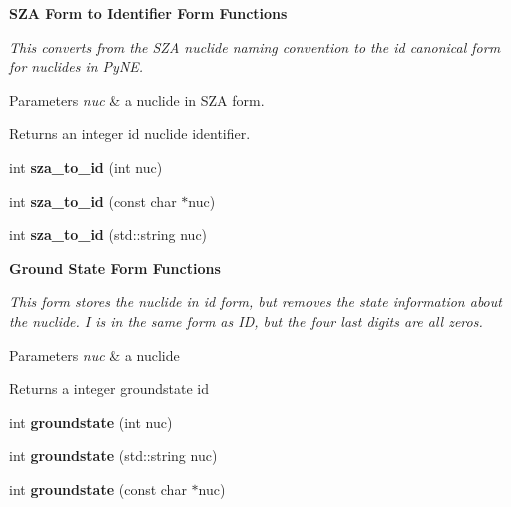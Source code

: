 \begin{Indent}{\bf S\+ZA Form to Identifier Form Functions}\par
{\em This converts from the S\+ZA nuclide naming convention to the id canonical form for nuclides in Py\+NE. 
\begin{DoxyParams}{Parameters}
{\em nuc} & a nuclide in S\+ZA form. \\
\hline
\end{DoxyParams}
\begin{DoxyReturn}{Returns}
an integer id nuclide identifier. 
\end{DoxyReturn}
}\begin{DoxyCompactItemize}
\item 
int {\bfseries sza\+\_\+to\+\_\+id} (int nuc)\hypertarget{namespacepyne_1_1nucname_a2d97b24683f8a35a3ab716807fbfccbc}{}\label{namespacepyne_1_1nucname_a2d97b24683f8a35a3ab716807fbfccbc}

\item 
int {\bfseries sza\+\_\+to\+\_\+id} (const char $\ast$nuc)\hypertarget{namespacepyne_1_1nucname_a364b3367dbdec6b1db26454e46206365}{}\label{namespacepyne_1_1nucname_a364b3367dbdec6b1db26454e46206365}

\item 
int {\bfseries sza\+\_\+to\+\_\+id} (std\+::string nuc)\hypertarget{namespacepyne_1_1nucname_af4d6093c95bb523de10c8c6bb93224aa}{}\label{namespacepyne_1_1nucname_af4d6093c95bb523de10c8c6bb93224aa}

\end{DoxyCompactItemize}
\end{Indent}
\begin{Indent}{\bf Ground State Form Functions}\par
{\em This form stores the nuclide in id form, but removes the state information about the nuclide. I is in the same form as ID, but the four last digits are all zeros. 
\begin{DoxyParams}{Parameters}
{\em nuc} & a nuclide \\
\hline
\end{DoxyParams}
\begin{DoxyReturn}{Returns}
a integer groundstate id 
\end{DoxyReturn}
}\begin{DoxyCompactItemize}
\item 
int {\bfseries groundstate} (int nuc)\hypertarget{namespacepyne_1_1nucname_a81937700730c53c357f2902b9f7efa15}{}\label{namespacepyne_1_1nucname_a81937700730c53c357f2902b9f7efa15}

\item 
int {\bfseries groundstate} (std\+::string nuc)\hypertarget{namespacepyne_1_1nucname_a1cc9dcbea2e73a8ffffed55fecff9766}{}\label{namespacepyne_1_1nucname_a1cc9dcbea2e73a8ffffed55fecff9766}

\item 
int {\bfseries groundstate} (const char $\ast$nuc)\hypertarget{namespacepyne_1_1nucname_a1eeed5454ab42774ebd86c84e1b3033f}{}\label{namespacepyne_1_1nucname_a1eeed5454ab42774ebd86c84e1b3033f}

\end{DoxyCompactItemize}
\end{Indent}
